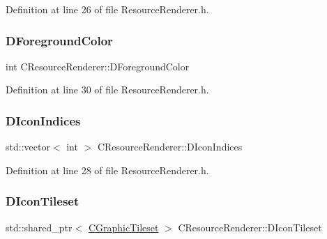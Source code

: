 Definition at line 26 of file Resource\+Renderer.\+h.

\hypertarget{classCResourceRenderer_a8605027f29776f3042e1c3f9072d4390}{}\label{classCResourceRenderer_a8605027f29776f3042e1c3f9072d4390} 
\subsubsection{\texorpdfstring{D\+Foreground\+Color}{DForegroundColor}}
{\footnotesize\ttfamily int C\+Resource\+Renderer\+::\+D\+Foreground\+Color\hspace{0.3cm}{\ttfamily [protected]}}



Definition at line 30 of file Resource\+Renderer.\+h.

\hypertarget{classCResourceRenderer_a18c32c2685ee404dc0177b977fb2da59}{}\label{classCResourceRenderer_a18c32c2685ee404dc0177b977fb2da59} 
\subsubsection{\texorpdfstring{D\+Icon\+Indices}{DIconIndices}}
{\footnotesize\ttfamily std\+::vector$<$ int $>$ C\+Resource\+Renderer\+::\+D\+Icon\+Indices\hspace{0.3cm}{\ttfamily [protected]}}



Definition at line 28 of file Resource\+Renderer.\+h.

\hypertarget{classCResourceRenderer_a6a4bc80e88c35798259d3235785a1a5f}{}\label{classCResourceRenderer_a6a4bc80e88c35798259d3235785a1a5f} 
\subsubsection{\texorpdfstring{D\+Icon\+Tileset}{DIconTileset}}
{\footnotesize\ttfamily std\+::shared\+\_\+ptr$<$ \hyperlink{classCGraphicTileset}{C\+Graphic\+Tileset} $>$ C\+Resource\+Renderer\+::\+D\+Icon\+Tileset\hspace{0.3cm}{\ttfamily [protected]}}



